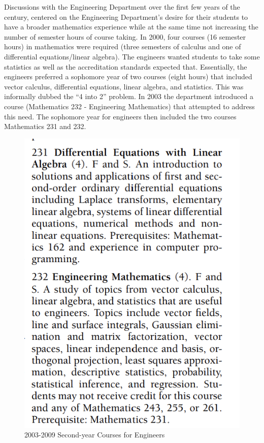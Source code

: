 \documentclass[
]{book}
\begin{document}
Discussions with the Engineering Department over the first few years of the century, centered on the Engineering Department's desire for their students to have a broader mathematics experience while at the same time not increasing the number of semester hours of course taking. In 2000, four courses (16 semester hours) in mathematics were required (three semesters of calculus and one of differential equations/linear algebra). The engineers wanted students to take some statistics as well as the accreditation standards expected that. Essentially, the engineers preferred a sophomore year of two courses (eight hours) that included vector calculus, differential equations, linear algebra, and statistics. This was informally dubbed the ``4 into 2'' problem. In 2003 the department introduced a course (Mathematics 232 - Engineering Mathematics) that attempted to address this need. The sophomore year for engineers then included the two courses Mathematics 231 and 232.

\begin{figure}

{\centering \includegraphics[width=6.67in]{images/M232} 

}

\caption{2003-2009 Second-year Courses for Engineers}\label{fig:M232}
\end{figure}
\end{document}
